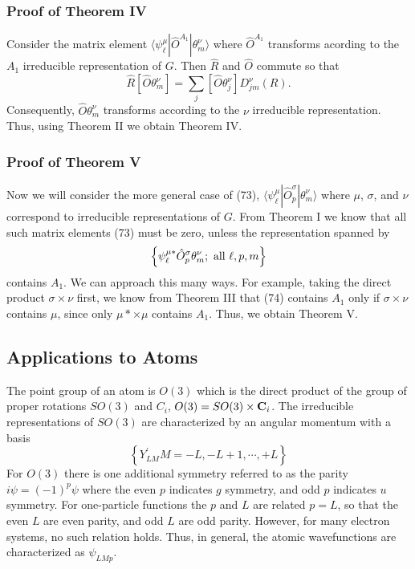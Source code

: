 \subsubsection{Proof of Theorem IV}

Consider the matrix element $\langle \psi^{\mu}_{\ell} | 
{\hat{O}}^{A_1} | \theta^{\nu}_m \rangle$ where ${\hat{O}}^{A_1}$ 
transforms acording to the $A_1$ irreducible representation of $G$.  
Then ${\hat{R}}$ and ${\hat{O}}$ commute so that
\begin{equation}
{\hat{R}} \left[ {\hat{O}} \theta^{\nu}_m \right] = \sum_{j} \left[ 
{\hat{O}} \theta^{\nu}_j \right] D^{\nu}_{jm} (R).
\end{equation}
Consequently, ${\hat{O}} \theta^{\nu}_m$ transforms according to the  
$\nu$ irreducible representation.  Thus, using Theorem II we obtain 
Theorem IV.

\subsubsection{Proof of Theorem V}

Now we will consider the more general case of (73), $\langle 
\psi^{\mu}_{\ell} | {\hat{O}}^{\sigma}_p | \theta^{\nu}_m \rangle$ 
where $\mu$, $\sigma$, and $\nu$ correspond to
irreducible representations of $G$.   From Theorem I we know that all 
such matrix elements (73) must be zero, unless the 
representation spanned by
\begin{equation}
\left\{ \psi^{\mu *}_{\ell} {\hat{O}}^{\sigma}_p \theta^{\nu}_m; ~ 
{\rm all} ~ \ell , p , m \right\}
\label{chap16-eqno74}
\end{equation}
contains $A_1$.  We can approach this many ways.  For example, taking 
the direct product $\sigma \times \nu$ first, we know from Theorem III 
that (74) contains $A_1$ only if $\sigma \times \nu$ contains $\mu$, 
since only $\mu * \times \mu$ contains $A_1$.  Thus, we obtain Theorem 
V.

\subsection{Applications to Atoms}

The point group of an atom is $O(3)$ which is the direct product of 
the group of proper rotations $SO(3)$ and $C_i$, $O(3) = SO(3) 
\times {\bf C}_i$.  The irreducible representations of $SO(3)$ are 
characterized by an angular momentum with a basis
\begin{equation}
\left\{ Y^{\prime}_{LM} M = - L , - L + 1 , \cdots , + L 
\right\}
\label{chap16-eqno75}
\end{equation}
For $O(3)$ there is one additional symmetry referred to as the parity 
$i \psi = ( - 1)^p \psi$ where the even $p$ indicates $g$ symmetry, 
and odd $p$ indicates $u$ symmetry.  For one-particle functions the 
$p$ and $L$ are related $p = L$, so that the even $L$ are even 
parity, and odd $L$ are odd parity.  However, for many electron 
systems, no such relation holds.  Thus, in general, the atomic 
wavefunctions are characterized as $\psi_{LMp}$.

